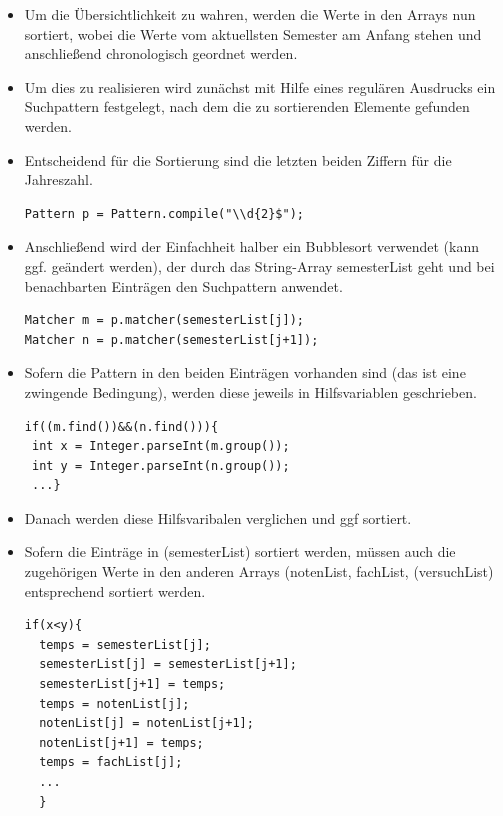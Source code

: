 \begin{description}
\begin{itemize}
\item Um die Übersichtlichkeit zu wahren, werden die Werte in den Arrays nun sortiert, wobei die Werte vom aktuellsten Semester am Anfang stehen und anschließend chronologisch geordnet werden.
\item Um dies zu realisieren wird zunächst mit Hilfe eines regulären Ausdrucks ein Suchpattern festgelegt, nach dem die zu sortierenden Elemente gefunden werden.
\item Entscheidend für die Sortierung sind die letzten beiden Ziffern für die Jahreszahl.
\begin{lstlisting}
Pattern p = Pattern.compile("\\d{2}$");
\end{lstlisting}
\item Anschließend wird der Einfachheit halber ein Bubblesort  verwendet (kann ggf. geändert werden), der durch das String-Array \textcolor{lila}{semesterList} geht und bei benachbarten Einträgen den Suchpattern anwendet.
\begin{lstlisting}
Matcher m = p.matcher(semesterList[j]);
Matcher n = p.matcher(semesterList[j+1]);
\end{lstlisting}

\item Sofern die Pattern in den beiden Einträgen vorhanden sind (das ist eine zwingende Bedingung), werden diese jeweils in Hilfsvariablen geschrieben.
\begin{lstlisting}
if((m.find())&&(n.find())){
 int x = Integer.parseInt(m.group());
 int y = Integer.parseInt(n.group());
 ...}
\end{lstlisting}
\item Danach werden diese Hilfsvaribalen verglichen und ggf sortiert. 
\item Sofern die Einträge in (\textcolor{lila}{semesterList}) sortiert werden, müssen auch die zugehörigen Werte in den anderen Arrays (\textcolor{lila}{notenList}, \textcolor{lila}{fachList}, (\textcolor{lila}{versuchList}) entsprechend sortiert werden.
\begin{lstlisting}
if(x<y){
  temps = semesterList[j];
  semesterList[j] = semesterList[j+1];
  semesterList[j+1] = temps;
  temps = notenList[j];
  notenList[j] = notenList[j+1];
  notenList[j+1] = temps;
  temps = fachList[j];
  ...
  }
\end{lstlisting}


\end{itemize}
\end{description}
